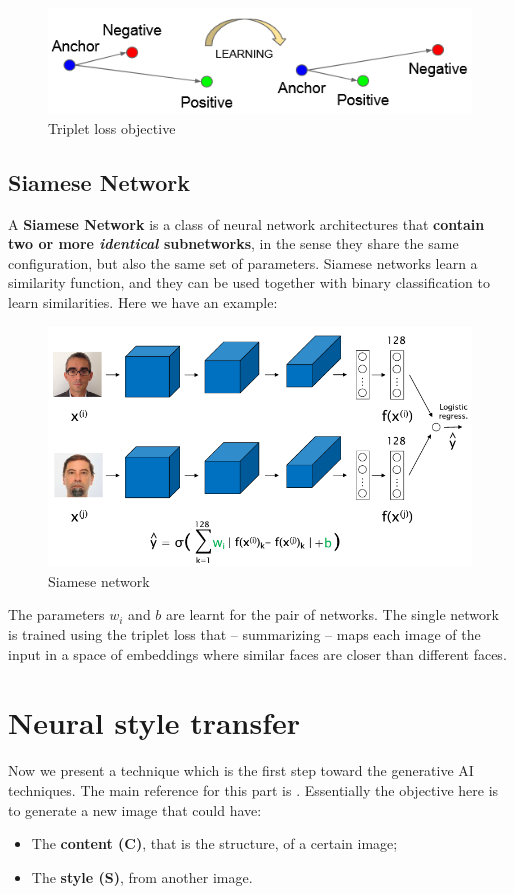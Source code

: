 \begin{figure}
    \centering
    \includegraphics[scale=0.8]{img/triplet.png}
    \caption{Triplet loss objective}
\end{figure}

\subsection{Siamese Network}
A \textbf{Siamese Network} is a class of neural network architectures that \textbf{contain two or more \textit{identical} subnetworks}, in the sense they share the same configuration, but also the same set of parameters. Siamese networks learn a similarity function, and they can be used together with binary classification to learn similarities. Here we have an example: 

\begin{figure}[h]
    \centering
    \includegraphics[scale=0.7]{img/siamese_2.png}
    \caption{Siamese network}
\end{figure}
The parameters $w_i$ and $b$ are learnt for the pair of networks. The single network is trained using the triplet loss that -- summarizing -- maps each image of the input in a space of embeddings where similar faces are closer than different faces.

\section{Neural style transfer}
Now we present a technique which is the first step toward the generative AI techniques. The main reference for this part is \textit{ \cite{gatys2015neural}}. Essentially the objective here is to generate a new image that could have:
\begin{itemize}
    \itemsep-0.2em
    \item The \textbf{content (C)}, that is the structure, of a certain image;
    \item The \textbf{style (S)}, from another image.
\end{itemize}

